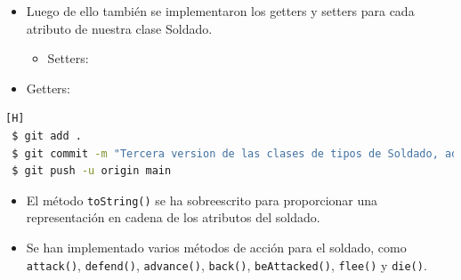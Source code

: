 \documentclass{article}
\begin{document}
\begin{itemize}
    \item Luego de ello también se implementaron los getters y setters para cada atributo de nuestra clase Soldado.
    \begin{itemize}
        \item Setters: 
    \end{itemize}
\end{itemize}



\newpage %

\begin{itemize}
    \begin{itemize}
        \item Getters: 
    \end{itemize}
\end{itemize}


\begin{lstlisting}[language=bash,caption={Commit \href{https://github.com/hernanchoquehuanca/fp2-23b/commit/fa2cce4fc1118c6715afb739dbb21c4c89d9f860}{fa2cce4}: Se  completaron métodos que se utilizarán en la clase principal VideoJuego7.java}][H]
 $ git add .
 $ git commit -m "Tercera version de las clases de tipos de Soldado, ademas de modificar la clase principal (VideoJuego7.java)"			
 $ git push -u origin main
\end{lstlisting}

\newpage %

\begin{itemize}
    \item El método \texttt{toString()} se ha sobreescrito para proporcionar una representación en cadena de los atributos del soldado.
\end{itemize}



\newpage 

\begin{itemize}
    \item Se han implementado varios métodos de acción para el soldado, como \texttt{attack()}, \texttt{defend()}, \texttt{advance()}, \texttt{back()}, \texttt{beAttacked()}, \texttt{flee()} y \texttt{die()}.
\end{itemize}

\end{document}
